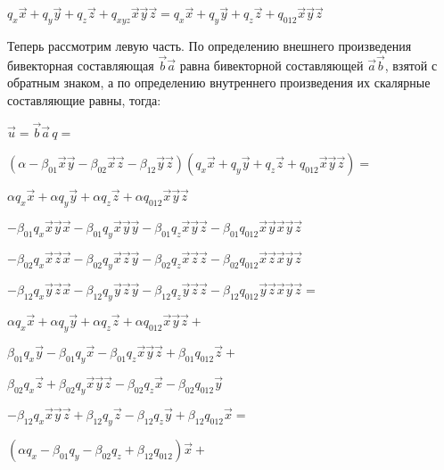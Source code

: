 \documentclass{article} %
\begin{document}
{$q_x \vec{x} + q_y \vec{y} + q_z \vec{z} +q_{xyz} \vec{x}\vec{y}\vec{z} = q_x \vec{x} + q_y \vec{y} + q_z \vec{z} +q_{012} \vec{x}\vec{y}\vec{z}$

\newpage

\noindent
Теперь рассмотрим левую часть. По определению внешнего произведения бивекторная составляющая $\vec{b}\vec{a}$ равна бивекторной составляющей $\vec{a}\vec{b}$, взятой с обратным знаком, а по определению внутреннего произведения их скалярные составляющие равны, тогда:

\hfill

$\vec{u} = \vec{b}\vec{a}\, q =$

$(\alpha - \beta_{01} \vec{x} \vec{y} - \beta_{02}\vec{x} \vec{z} - \beta_{12} \vec{y} \vec{z}) (q_x \vec{x} + q_y \vec{y} + q_z \vec{z} + q_{012} \vec{x}\vec{y}\vec{z}) =$

\hfill

$\alpha q_x \vec{x} + \alpha q_y \vec{y} + \alpha q_z \vec{z} + \alpha q_{012} \vec{x}\vec{y}\vec{z}$

$- \beta_{01} q_x \vec{x} \vec{y} \vec{x} - \beta_{01} q_y \vec{x} \vec{y} \vec{y} - \beta_{01} q_z \vec{x} \vec{y} \vec{z}- \beta_{01} q_{012} \vec{x} \vec{y} \vec{x}\vec{y}\vec{z}$

$- \beta_{02} q_x \vec{x} \vec{z} \vec{x} - \beta_{02} q_y \vec{x} \vec{z} \vec{y} - \beta_{02} q_z \vec{x} \vec{z} \vec{z}- \beta_{02} q_{012} \vec{x} \vec{z} \vec{x}\vec{y}\vec{z}$

$- \beta_{12} q_x \vec{y} \vec{z} \vec{x} - \beta_{12} q_y \vec{y} \vec{z} \vec{y} - \beta_{12} q_z \vec{y} \vec{z} \vec{z}- \beta_{12} q_{012} \vec{y} \vec{z} \vec{x}\vec{y}\vec{z} =$

\hfill

$\alpha q_x \vec{x} + \alpha q_y \vec{y} + \alpha q_z \vec{z} + \alpha q_{012} \vec{x}\vec{y}\vec{z} +$

$\beta_{01} q_x \vec{y} - \beta_{01} q_y \vec{x} - \beta_{01} q_z \vec{x} \vec{y} \vec{z} + \beta_{01} q_{012} \vec{z} +$

$\beta_{02} q_x \vec{z} + \beta_{02} q_y \vec{x}  \vec{y} \vec{z} - \beta_{02} q_z \vec{x} - \beta_{02} q_{012} \vec{y}$

$- \beta_{12} q_x \vec{x} \vec{y} \vec{z} + \beta_{12} q_y \vec{z} - \beta_{12} q_z \vec{y} + \beta_{12} q_{012} \vec{x} =$

\hfill

$(\alpha q_x - \beta_{01} q_y - \beta_{02} q_z + \beta_{12} q_{012}) \vec{x} +$

}
\end{document}
